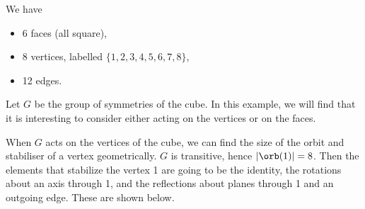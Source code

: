 \documentclass[a4]{scrreprt}
\begin{document}
\begin{center}
\begin{tikzpicture}[x=0.75pt,y=0.75pt,yscale=-1,xscale=1]
\end{tikzpicture}

\end{center}

We have
\begin{itemize}
	\item 6 faces (all square),
	\item 8 vertices, labelled $\{1, 2, 3, 4, 5, 6, 7, 8\}$,
	\item 12 edges.
\end{itemize}

Let $G$ be the group of symmetries of the cube. In this example, we will find that it is interesting to consider either acting on the vertices or on the faces.

When $G$ acts on the vertices of the cube, we can find the size of the orbit and stabiliser of a vertex geometrically. $G$ is transitive, hence $|\orb(1)| = 8$. Then the elements that stabilize the vertex 1 are going to be the identity, the rotations about an axis through 1, and the reflections about planes through 1 and an outgoing edge. These are shown below.
\end{document}
